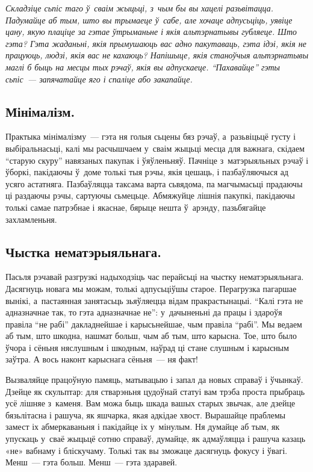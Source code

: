\emph{Складзіце сьпіс таго ў~сваім жыцьці, з~чым бы вы хацелі разьвітацца. Падумайце аб тым, што вы трымаеце ў~сабе, але хочаце адпусьціць, уявіце цану, якую плаціце за гэтае ўтрыманьне і якія альтэрнатывы губляеце. Што гэта? Гэта жаданьні, якія прымушаюць вас адно пакутаваць, гэта ідэі, якія не працуюць, людзі, якія вас не кахаюць? Напішыце, якія станоўчыя альтэрнатывы маглі б быць на месцы тых рэчаў, якія вы адпускаеце. ``Пахавайце'' гэты сьпіс~--- запячатайце яго і спаліце або закапайце.}

\subsection*{Мінімалізм.}

Практыка мінімалізму~--- гэта ня голыя сьцены бяз рэчаў, а~разьвіцьцё густу і выбіральнасьці, калі мы расчышчаем у~сваім жыцьці месца для важнага, скідаем ``старую скуру'' навязаных пакупак і ўяўленьняў. Пачніце з~матэрыяльных рэчаў і ўборкі, пакідаючы ў~доме толькі тыя рэчы, якія цешаць, і пазбаўляючыся ад усяго астатняга. Пазбаўляцца таксама варта сьвядома, па магчымасьці прадаючы ці раздаючы рэчы, сартуючы сьмецьце. Абмяжуйце лішнія пакупкі, пакідаючы толькі самае патрэбнае і якаснае, бярыце нешта ў~арэнду, пазьбягайце захламленьня.

\subsection*{Чыстка нематэрыяльнага.}

Пасьля рэчавай разгрузкі надыходзіць час перайсьці на чыстку нематэрыяльнага. Дасягнуць новага мы можам, толькі адпусьціўшы старое. Перагрузка пагаршае вынікі, а~пастаянная занятасьць зьяўляецца відам пракрастынацыі. ``Калі гэта не адназначнае так, то гэта адназначнае не'': у~дачыненьні да працы і здароўя правіла ``не рабі'' дакладнейшае і карысьнейшае, чым правіла ``рабі''. Мы ведаем аб тым, што шкодна, нашмат больш, чым аб тым, што карысна. Тое, што было ўчора і сёньня няслушным і шкодным, наўрад ці стане слушным і карысным заўтра. А вось наконт карыснага сёньня~--- ня факт!

Вызваляйце працоўную памяць, матывацыю і запал да новых справаў і ўчынкаў. Дзейце як скульптар: для стварэньня цудоўнай статуі вам трэба проста прыбраць усё лішняе з~каменя. Вам можа быць шкада вашых старых звычак, але дзейце бязьлітасна і рашуча, як яшчарка, якая адкідае хвост. Вырашайце праблемы замест іх абмеркаваньня і пакідайце іх у~мінулым. Ня думайце аб тым, як упускаць у~сваё жыцьцё сотню справаў, думайце, як адмаўляцца і рашуча казаць «не» вабнаму і бліскучаму. Толькі так вы зможаце дасягнуць фокусу і ўвагі. Менш~--- гэта больш. Менш~--- гэта здаравей.

